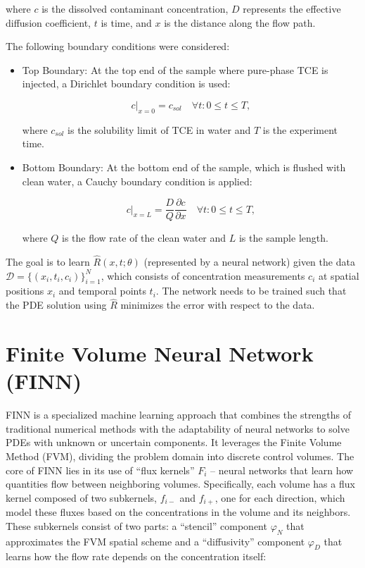where $c$ is the dissolved contaminant concentration, $D$ represents the effective diffusion coefficient, $t$ is time, and $x$ is the distance along the flow path.

The following boundary conditions were considered:

\begin{itemize}
    \item Top Boundary: At the top end of the sample where pure-phase TCE is injected, a Dirichlet boundary condition is used:

    \begin{equation}
        c|_{x=0} = c_{sol} \quad \forall t : 0 \leq t \leq T,
    \end{equation}

    where $c_{sol}$ is the solubility limit of TCE in water and $T$ is the experiment time.

    \item Bottom Boundary: At the bottom end of the sample, which is flushed with clean water, a Cauchy boundary condition is applied:

    \begin{equation}
        c|_{x=L} = \frac{D}{Q} \frac{\partial c}{\partial x} \quad \forall t : 0 \leq t \leq T,
    \end{equation}

    where $Q$ is the flow rate of the clean water and $L$ is the sample length.
\end{itemize}

The goal is to learn $\hat{R}(x,t;\theta)$ (represented by a neural network) given the data $\mathcal{D} = \{ (x_i, t_i, c_i) \}_{i=1}^N$, which consists of concentration measurements $c_i$ at spatial positions $x_i$ and temporal points $t_i$. The network needs to be trained such that the PDE solution using $\hat{R}$ minimizes the error with respect to the data.




\section{Finite Volume Neural Network (FINN)}

FINN is a specialized machine learning approach that combines the strengths of traditional numerical methods with the adaptability of neural networks to solve PDEs with unknown or uncertain components. It leverages the Finite Volume Method (FVM), dividing the problem domain into discrete control volumes. The core of FINN lies in its use of ``flux kernels'' $F_i$ – neural networks that learn how quantities flow between neighboring volumes. Specifically, each volume has a flux kernel composed of two subkernels, $f_{i-}$ and $f_{i+}$, one for each direction, which model these fluxes based on the concentrations in the volume and its neighbors. These subkernels consist of two parts: a ``stencil'' component $\varphi_N$ that approximates the FVM spatial scheme and a ``diffusivity'' component $\varphi_D$ that learns how the flow rate depends on the concentration itself:

